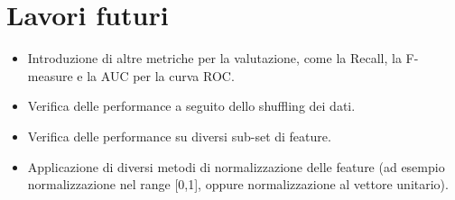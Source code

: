 \documentclass[fleqn,10pt]{SelfArx} %
\begin{document}
\section{Lavori futuri}
\begin{itemize}
\item Introduzione di altre metriche per la valutazione, come la Recall, la F-measure e la AUC per la curva ROC.
\item Verifica delle performance a seguito dello shuffling dei dati.
\item Verifica delle performance su diversi sub-set di feature.
\item Applicazione di diversi metodi di normalizzazione delle feature (ad esempio normalizzazione nel range [0,1], oppure normalizzazione al vettore unitario).

\end{itemize}







\end{document}
